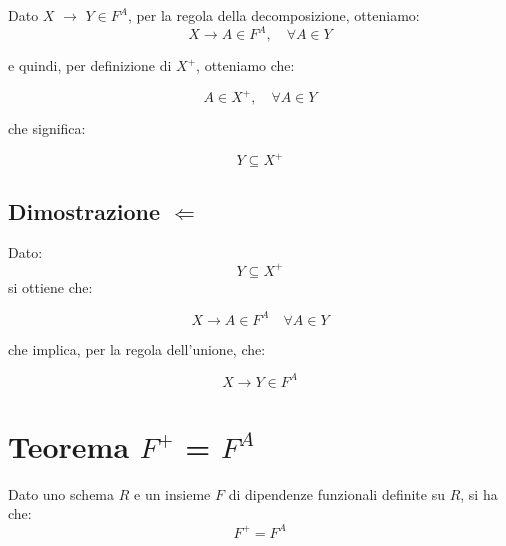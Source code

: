 \documentclass{article}
\begin{document}
Dato $X$ $\rightarrow$ $Y \in F^{A}$, per la regola della decomposizione, otteniamo:
\[X \rightarrow A \in F^{A}, \quad \forall A \in Y\]

e quindi, per definizione di $X^{+}$, otteniamo che: 

\[A \in X^{+}, \quad \forall A \in Y  \]

che significa: 

\[Y \subseteq X^{+}\]



\subsection{Dimostrazione $\Leftarrow$}
Dato: 
\[Y \subseteq X^{+}\]
si ottiene che: 

\[X \rightarrow A \in F^{A} \quad \forall A \in Y\]

che implica, per la regola dell'unione, che: 

\[X \rightarrow Y \in F^{A}\]


\pagebreak
\section{Teorema $F^{+}$ = $F^{A}$}

Dato uno schema $R$ e un insieme $F$ di dipendenze funzionali definite su $R$, si ha che:
\[ F^{+} = F^{A}\]
\end{document}
